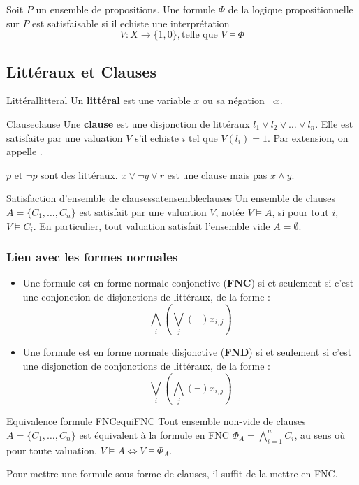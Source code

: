 \begin{remark}
    Soit $P$ un ensemble de propositions. Une formule $\Phi$ de la logique propositionnelle sur $P$ est satisfaisable si il echiste une interprétation
    \begin{equation*}
        V : X \rightarrow \{1, 0\}, \text{telle que } V \models \Phi
    \end{equation*}
\end{remark}
\subsection{Littéraux et Clauses}
\begin{definition}{Littéral}{litteral}
    Un \textbf{littéral} est une variable $x$ ou sa négation $\neg x$.
\end{definition}
\begin{definition}{Clause}{clause}
    Une \textbf{clause} est une disjonction de littéraux $l_1 \vee l_2 \vee \dots \vee l_n$. Elle est satisfaite par une valuation $V$ s'il echiste $i$ tel que $V(l_i) = 1$. Par extension, on appelle .
\end{definition}
\begin{example}
    $p$ et $\neg p$ sont des littéraux. $x \vee\neg y \vee r$ est une clause mais pas $x \wedge y$.
\end{example}
\begin{theorem}{Satisfaction d'ensemble de clauses}{satensembleclauses}
    Un ensemble de clauses $A = \{C_1, \dots, C_n\}$ est satisfait par une valuation $V$, notée $V \models A$, si pour tout $i$, $V \models C_i$. En particulier, tout valuation satisfait l'ensemble vide $A = \emptyset$.
\end{theorem}
\subsubsection{Lien avec les formes normales}
\begin{itemize}[label=\textbullet]
    \item Une formule est en forme normale conjonctive (\textbf{FNC}) si et seulement si c'est une conjonction de disjonctions de littéraux, de la forme :
    \begin{equation*}
        \bigwedge_i(\bigvee_j(\neg)x_{i,j})
    \end{equation*}
    \item Une formule est en forme normale disjonctive (\textbf{FND}) si et seulement si c'est une disjonction de conjonctions de littéraux, de la forme :
    \begin{equation*}
        \bigvee_i(\bigwedge_j(\neg)x_{i,j})
    \end{equation*}
\end{itemize}
\begin{lemma}{Equivalence formule FNC}{equiFNC}
    Tout ensemble non-vide de clauses $A = \{C_1,\dots,C_n\}$ est équivalent à la formule en FNC $\Phi_A = \bigwedge_{i=1}^{n} C_i$, au sens où pour toute valuation, $V \models A \Leftrightarrow V \models \Phi_A$.
\end{lemma}
\begin{remark}
    Pour mettre une formule sous forme de clauses, il suffit de la mettre en FNC.
\end{remark}

